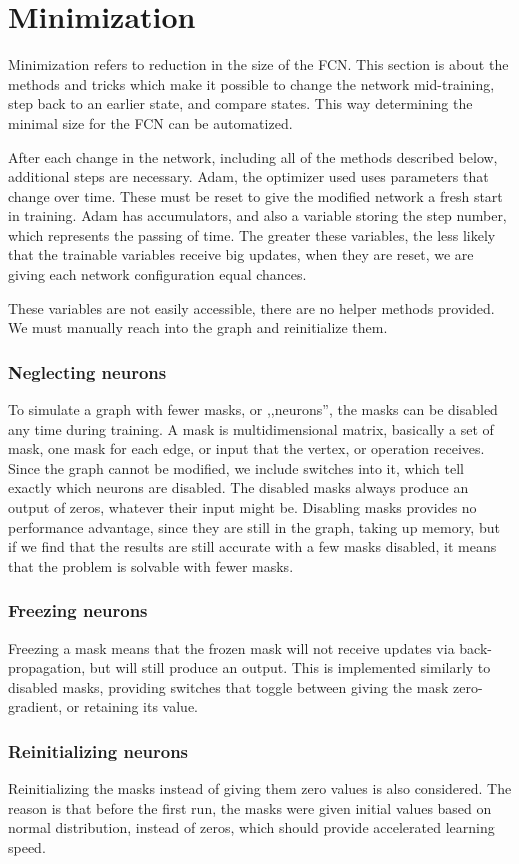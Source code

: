 \documentclass[12pt]{report}
\begin{document}
\section{Minimization}
Minimization refers to reduction in the size of the FCN. This section is about the methods and tricks which make it possible to change the network mid-training, step back to an earlier state, and compare states. This way determining the minimal size for the FCN can be automatized.\par
After each change in the network, including all of the methods described below, additional steps are necessary. Adam, the optimizer used uses parameters that change over time. These must be reset to give the modified network a fresh start in training. Adam has accumulators, and also a variable storing the step number, which represents the passing of time. The greater these variables, the less likely that the trainable variables receive big updates, when they are reset, we are giving each network configuration equal chances.\par
These variables are not easily accessible, there are no helper methods provided. We must manually reach into the graph and reinitialize them.
\subsubsection{Neglecting neurons}
To simulate a graph with fewer masks, or ,,neurons'', the masks can be disabled any time during training. A mask is  multidimensional matrix, basically a set of mask, one mask for each edge, or input that the vertex, or operation receives. Since the graph cannot be modified, we include switches into it, which tell exactly which neurons are disabled. The disabled masks always produce an output of zeros, whatever their input might be. Disabling masks provides no performance advantage, since they are still in the graph, taking up memory, but if we find that the results are still accurate with a few masks disabled, it means that the problem is solvable with fewer masks.
\subsubsection{Freezing neurons}
Freezing a mask means that the frozen mask will not receive updates via back-propagation, but will still produce an output. This is implemented similarly to disabled masks, providing switches that toggle between giving the mask zero-gradient, or retaining its value.
\subsubsection{Reinitializing neurons}
Reinitializing the masks instead of giving them zero values is also considered. The reason is that before the first run, the masks were given initial values based on normal distribution, instead of zeros, which should provide accelerated learning speed.
\end{document}
